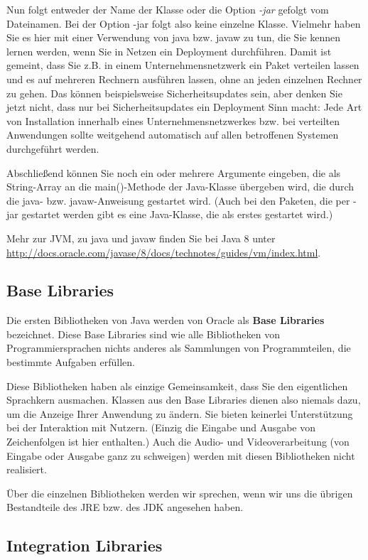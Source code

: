 Nun folgt entweder der Name der Klasse oder die Option \emph{-jar} gefolgt vom Dateinamen. Bei der Option -jar folgt also keine einzelne Klasse. Vielmehr haben Sie es hier mit einer Verwendung von java bzw. javaw zu tun, die Sie kennen lernen werden, wenn Sie in Netzen ein Deployment durchführen. Damit ist gemeint, dass Sie z.B. in einem Unternehmensnetzwerk ein Paket verteilen lassen und es auf mehreren Rechnern ausführen lassen, ohne an jeden einzelnen Rechner zu gehen. Das können beispielsweise Sicherheitsupdates sein, aber denken Sie jetzt nicht, dass nur bei Sicherheitsupdates ein Deployment Sinn macht: Jede Art von Installation innerhalb eines Unternehmensnetzwerkes bzw. bei verteilten Anwendungen sollte weitgehend automatisch auf allen betroffenen Systemen durchgeführt werden.

Abschließend können Sie noch ein oder mehrere Argumente eingeben, die als String-Array an die main()-Methode der Java-Klasse übergeben wird, die durch die java- bzw. javaw-Anweisung gestartet wird. (Auch bei den Paketen, die per -jar gestartet werden gibt es eine Java-Klasse, die als erstes gestartet wird.)

Mehr zur JVM, zu java und javaw finden Sie bei Java 8 unter \url{http://docs.oracle.com/javase/8/docs/technotes/guides/vm/index.html}. 

\subsection{Base Libraries}

Die ersten Bibliotheken von Java werden von Oracle als \textbf{Base Libraries} bezeichnet. Diese Base Libraries sind wie alle Bibliotheken von Programmiersprachen nichts anderes als Sammlungen von Programmteilen, die bestimmte Aufgaben erfüllen.

Diese Bibliotheken haben als einzige Gemeinsamkeit, dass Sie den eigentlichen Sprachkern ausmachen. Klassen aus den Base Libraries dienen also niemals dazu, um die Anzeige Ihrer Anwendung zu ändern. Sie bieten keinerlei Unterstützung bei der Interaktion mit Nutzern. (Einzig die Eingabe und Ausgabe von Zeichenfolgen ist hier enthalten.) Auch die Audio- und Videoverarbeitung (von Eingabe oder Ausgabe ganz zu schweigen) werden mit diesen Bibliotheken nicht realisiert.

Über die einzelnen Bibliotheken werden wir sprechen, wenn wir uns die übrigen Bestandteile des JRE bzw. des JDK angesehen haben.

\subsection{Integration Libraries}

